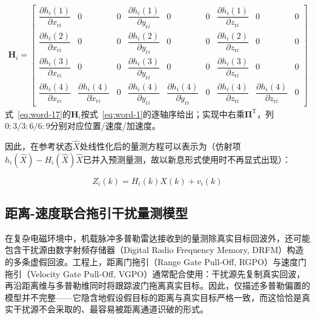 \documentclass[UTF8,a4paper,zihao=-4]{ctexart}
\begin{document}
\begin{equation}
\begin{gathered}\textstyle \mathbf{H}_i=\begin{bmatrix}
\dfrac{\partial h_i(1)}{\partial x_{\mathrm ri}}&0&0&\dfrac{\partial h_i(1)}{\partial y_{\mathrm ri}}&0&0&\dfrac{\partial h_i(1)}{\partial z_{\mathrm ri}}&0&0\\[5pt]
\dfrac{\partial h_i(2)}{\partial x_{\mathrm ri}}&0&0&\dfrac{\partial h_i(2)}{\partial y_{\mathrm ri}}&0&0&\dfrac{\partial h_i(2)}{\partial z_{\mathrm ri}}&0&0\\[5pt]
\dfrac{\partial h_i(3)}{\partial x_{\mathrm ri}}&0&0&\dfrac{\partial h_i(3)}{\partial y_{\mathrm ri}}&0&0&\dfrac{\partial h_i(3)}{\partial z_{\mathrm ri}}&0&0\\[5pt]
\dfrac{\partial h_i(4)}{\partial x_{\mathrm ri}}&\dfrac{\partial h_i(4)}{\partial \dot{x}_{\mathrm ri}}&0&\dfrac{\partial h_i(4)}{\partial y_{\mathrm ri}}&\dfrac{\partial h_i(4)}{\partial \dot{y}_{\mathrm ri}}&0&\dfrac{\partial h_i(4)}{\partial z_{\mathrm ri}}&\dfrac{\partial h_i(4)}{\partial \dot{z}_{\mathrm ri}}&0
\end{bmatrix}\end{gathered}
\label{eq:word-17}
\end{equation}
式~\eqref{eq:word-17}的\(\boldsymbol H_i\)按式~\eqref{eq:word-1}的逐轴序给出；实现中右乘\(\boldsymbol\Pi^{\mathrm T}\)，列\(0:3/3:6/6:9\)分别对应位置/速度/加速度。

因此，在参考状态\(\hat{X}\)处线性化后的量测方程可以表示为（仿射项\(h_i(\hat X)-H_i(\hat X)\hat X\)已并入预测量测，故以新息形式使用时不再显式出现）：


\begin{equation}
Z_i(k)=H_i(k)X(k)+v_i(k)
\label{eq:word-18}
\end{equation}


\subsection{距离-速度联合拖引干扰量测模型}\label{sec:deception}

在复杂电磁环境中，机载脉冲多普勒雷达接收到的量测除真实目标回波外，还可能包含干扰源由数字射频存储器（Digital Radio Frequency Memory, DRFM）构造的多条虚假回波。工程上，距离门拖引（Range Gate Pull-Off, RGPO）与速度门拖引（Velocity Gate Pull-Off, VGPO）通常配合使用：干扰源先复制真实回波，再沿距离维与多普勒维同时将跟踪波门拖离真实目标。因此，仅描述多普勒偏置的模型并不完整——它隐含地假设假目标的距离与真实目标严格一致，而这恰恰是真实干扰源不会采取的、最容易被距离通道识破的形式。
\end{document}
